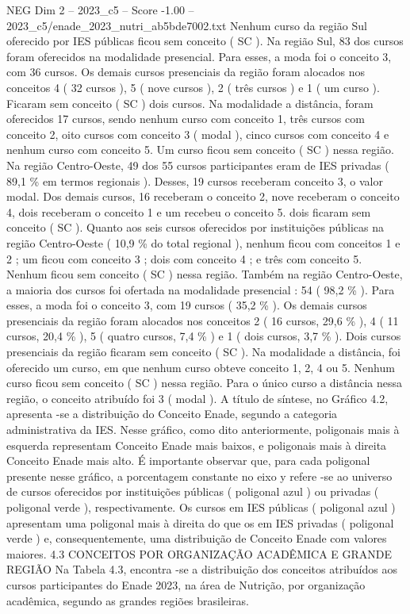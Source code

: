 \begin{textsample}{NEG Dim 2 – 2023\_c5 – Score -1.00 – 2023\_c5/enade\_2023\_nutri\_ab5bde7002.txt}
Nenhum curso da região Sul oferecido por IES públicas ficou sem conceito ( SC ).
Na região Sul, 83 dos cursos foram oferecidos na modalidade presencial.
Para esses, a moda foi o conceito 3, com 36 cursos.
Os demais cursos presenciais da região foram alocados nos conceitos 4 ( 32 cursos ), 5 ( nove cursos ), 2 ( três cursos ) e 1 ( um curso ).
Ficaram sem conceito ( SC ) dois cursos.
Na modalidade a distância, foram oferecidos 17 cursos, sendo nenhum curso com conceito 1, três cursos com conceito 2, oito cursos com conceito 3 ( modal ), cinco cursos com conceito 4 e nenhum curso com conceito 5.
Um curso ficou sem conceito ( SC ) nessa região.
Na região Centro-Oeste, 49 dos 55 cursos participantes eram de IES privadas ( 89,1 \% em termos regionais ).
Desses, 19 cursos receberam conceito 3, o valor modal.
Dos demais cursos, 16 receberam o conceito 2, nove receberam o conceito 4, dois receberam o conceito 1 e um recebeu o conceito 5. dois ficaram sem conceito ( SC ).
Quanto aos seis cursos oferecidos por instituições públicas na região Centro-Oeste ( 10,9 \% do total regional ), nenhum ficou com conceitos 1 e 2 ; um ficou com conceito 3 ; dois com conceito 4 ; e três com conceito 5.
Nenhum ficou sem conceito ( SC ) nessa região.
Também na região Centro-Oeste, a maioria dos cursos foi ofertada na modalidade presencial : 54 ( 98,2 \% ).
Para esses, a moda foi o conceito 3, com 19 cursos ( 35,2 \% ).
Os demais cursos presenciais da região foram alocados nos conceitos 2 ( 16 cursos, 29,6 \% ), 4 ( 11 cursos, 20,4 \% ), 5 ( quatro cursos, 7,4 \% ) e 1 ( dois cursos, 3,7 \% ).
Dois cursos presenciais da região ficaram sem conceito ( SC ).
Na modalidade a distância, foi oferecido um curso, em que nenhum curso obteve conceito 1, 2, 4 ou 5.
Nenhum curso ficou sem conceito ( SC ) nessa região.
Para o único curso a distância nessa região, o conceito atribuído foi 3 ( modal ).
A título de síntese, no Gráfico 4.2, apresenta -se a distribuição do Conceito Enade, segundo a categoria administrativa da IES.
Nesse gráfico, como dito anteriormente, poligonais mais à esquerda representam Conceito Enade mais baixos, e poligonais mais à direita Conceito Enade mais alto.
É importante observar que, para cada poligonal presente nesse gráfico, a porcentagem constante no eixo y refere -se ao universo de cursos oferecidos por instituições públicas ( poligonal azul ) ou privadas ( poligonal verde ), respectivamente.
Os cursos em IES públicas ( poligonal azul ) apresentam uma poligonal mais à direita do que os em IES privadas ( poligonal verde ) e, consequentemente, uma distribuição de Conceito Enade com valores maiores. 4.3 CONCEITOS POR ORGANIZAÇÃO ACADÊMICA E GRANDE REGIÃO Na Tabela 4.3, encontra -se a distribuição dos conceitos atribuídos aos cursos participantes do Enade 2023, na área de Nutrição, por organização acadêmica, segundo as grandes regiões brasileiras.

\end{textsample}
